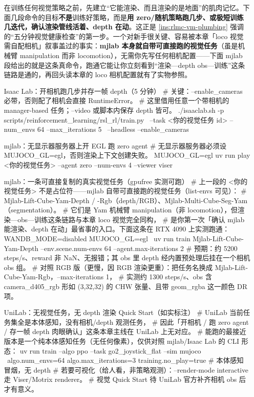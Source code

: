 在训练任何视觉策略之前，先建立“它能渲染、而且渲染的是地面”的肌肉记忆。下面几段命令的目标\textbf{不是}训练好策略，而是\textbf{用 zero/随机策略跑几步、或极短训练几迭代，确认渲染管线活着、depth 在动}。这正是 \cref{ins:rlmc-vm-plumbing} 强调的“五分钟视觉健康检查”的第一步。一个对新手很关键、容易被本章「loco 视觉需自配相机」叙事盖过的事实：\textbf{mjlab 本身就自带可直接跑的视觉任务}（虽是机械臂 manipulation 而非 locomotion），无需你先写任何相机配置——下面 mjlab 段给出的就是这条真命令，跑通它能让你立刻看到“渲染—depth obs—训练”这条链路是通的，再回头读本章的 loco 相机配置就有了实物参照。

\begin{codebox}[bash]{Isaac Lab：开相机跑几步并存一帧 depth（5 分钟）}
# 关键：--enable_cameras 必带，否则配了相机会直接 RuntimeError。
# 这里借用任意一个带相机的 manager-based 任务；--video 或脚本内保存 depth 皆可。
./isaaclab.sh -p scripts/reinforcement_learning/rsl_rl/train.py \
  --task <你的视觉任务 id> --num_envs 64 --max_iterations 5 \
  --headless --enable_cameras
\end{codebox}

\begin{codebox}[bash]{mjlab：无显示器服务器上开 EGL 跑 zero agent}
# 无显示器服务器必须设 MUJOCO_GL=egl，否则渲染上下文创建失败。
MUJOCO_GL=egl uv run play <你的视觉任务> --agent zero --num-envs 4 --viewer viser
\end{codebox}

\begin{codebox}[bash]{mjlab：一条可直接复制的真实视觉任务（gpufree 实测可跑）}
# 上一段的 <你的视觉任务> 不是占位符——mjlab 自带可直接跑的视觉任务（list-envs 可见）：
#   Mjlab-Lift-Cube-Yam-Depth / -Rgb（depth/RGB）、Mjlab-Multi-Cube-Seg-Yam（segmentation）。
# 它们是 Yam 机械臂 manipulation（非 locomotion），但渲染—obs—训练这条链路与本章 loco 视觉完全同构，
# 是你第一次「确认 mjlab 能渲染、depth 在动」最省事的入口。下面这条在 RTX 4090 上实测跑通：
WANDB_MODE=disabled MUJOCO_GL=egl \
  uv run train Mjlab-Lift-Cube-Yam-Depth --env.scene.num-envs 64 --agent.max-iterations 2
# 预期：约 5200 steps/s、reward 非 NaN、无报错；其 obs 里 depth 经内置预处理后挂在一个相机 obs 组。
# 对照 RGB 版（更慢，因 RGB 渲染更重）：把任务名换成 Mjlab-Lift-Cube-Yam-Rgb，--max-iterations 1，
#   实测约 1300 steps/s、obs 含 camera_d405_rgb 形如 (3,32,32) 的 CHW 张量、且带 geom_rgba 这一颜色 DR 项。
\end{codebox}

\begin{codebox}[bash]{UniLab：无视觉任务，无 depth 渲染 Quick Start（如实标注）}
# UniLab 当前任务集全是本体感知，没有相机/depth 观测任务，
# 因此「开相机 / 跑 zero agent / 存一帧 depth 肉眼确认」这条本章主线在 UniLab 上无对应。
# 能跑的最接近版本是一个纯本体感知任务（无任何像素），仅供对照 mjlab/Isaac Lab 的 CLI 形态：
uv run train --algo ppo --task go2_joystick_flat --sim mujoco \
    algo.num_envs=64 algo.max_iterations=3 training.no_play=true   # 本体感知冒烟，无 depth
# 若要可视化（给人看，非策略观测）：--render-mode interactive 走 Viser/Motrix renderer。
# 视觉 Quick Start 待 UniLab 官方补齐相机 obs 后才有意义。
\end{codebox}

